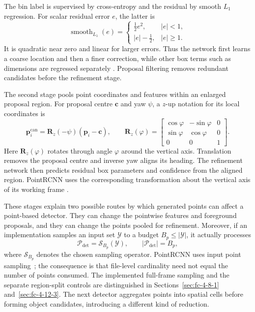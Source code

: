 The bin label is supervised by cross-entropy and the residual by smooth
$L_1$ regression. For scalar residual error $e$, the latter is
\begin{equation}
 \operatorname{smooth}_{L_1}(e)=
 \begin{cases}\tfrac12e^2,&|e|<1,\\|e|-\tfrac12,&|e|\ge1.\end{cases}
 \label{eq:smooth_l1}
\end{equation}
It is quadratic near zero and linear for larger errors. Thus the network
first learns a coarse location and then a finer correction, while other
box terms such as dimensions are regressed separately
\cite{shi2019pointrcnn}. Proposal filtering removes redundant candidates
before the refinement stage.

The second stage pools point coordinates and features within an enlarged
proposal region. For proposal centre $\mathbf c$ and yaw $\psi$, a
$z$-up notation for its local coordinates is
\begin{equation}
 \mathbf p_i^\mathrm{can}=\mathbf R_z(-\psi)(\mathbf p_i-\mathbf c),
 \qquad
 \mathbf R_z(\varphi)=
 \begin{bmatrix}
 \cos\varphi&-\sin\varphi&0\\
 \sin\varphi&\cos\varphi&0\\
 0&0&1
 \end{bmatrix}.
 \label{eq:canonical}
\end{equation}
Here $\mathbf R_z(\varphi)$ rotates through angle $\varphi$ around the
vertical axis. Translation removes the proposal centre and inverse yaw
aligns its heading. The refinement network then predicts residual box
parameters and confidence from the aligned region. PointRCNN uses the
corresponding transformation about the vertical axis of its working frame
\cite{shi2019pointrcnn}.

These stages explain two possible routes by which generated points can
affect a point-based detector. They can change the pointwise features and
foreground proposals, and they can change the points pooled for refinement.
Moreover, if an implementation samples an input set $\mathcal Y$ to a
budget $B_p\le|\mathcal Y|$, it actually processes
\begin{equation}
 \mathcal P_\mathrm{det}=\mathcal S_{B_p}(\mathcal Y),
 \qquad |\mathcal P_\mathrm{det}|=B_p,
 \label{eq:point_budget}
\end{equation}
where $\mathcal S_{B_p}$ denotes the chosen sampling operator. PointRCNN
uses input point sampling~\cite{shi2019pointrcnn}; the consequence is that
file-level cardinality need not equal the number of points consumed.
The implemented full-frame sampling and the separate region-split
controls are distinguished in Sections~\ref{sec:fc-4-8-1}
and~\ref{sec:fc-4-12-3}. The next detector aggregates points into spatial cells before
forming object candidates, introducing a different kind of reduction.

